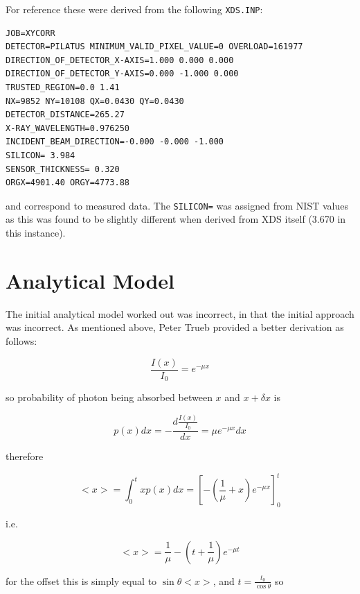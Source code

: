 \documentclass{article}
\begin{document}
\noindent
For reference these were derived from the following \verb|XDS.INP|:

{\small
\begin{verbatim}
JOB=XYCORR
DETECTOR=PILATUS MINIMUM_VALID_PIXEL_VALUE=0 OVERLOAD=161977
DIRECTION_OF_DETECTOR_X-AXIS=1.000 0.000 0.000
DIRECTION_OF_DETECTOR_Y-AXIS=0.000 -1.000 0.000
TRUSTED_REGION=0.0 1.41
NX=9852 NY=10108 QX=0.0430 QY=0.0430
DETECTOR_DISTANCE=265.27
X-RAY_WAVELENGTH=0.976250
INCIDENT_BEAM_DIRECTION=-0.000 -0.000 -1.000
SILICON= 3.984
SENSOR_THICKNESS= 0.320
ORGX=4901.40 ORGY=4773.88
\end{verbatim}
}

\noindent
and correspond to measured data. The \verb|SILICON=| was assigned
from NIST values as this was found to be slightly different when
derived from XDS itself (3.670 in this instance). 

\section{Analytical Model}

The initial analytical model worked out was incorrect, in that the
initial approach was incorrect. As mentioned above, Peter Trueb
provided a better derivation as follows:

\begin{equation}
\frac{I(x)}{I_0} = e^{- \mu x}
\end{equation}

\noindent
so probability of photon being absorbed between $x$ and $x + \delta x$
is

\begin{equation}
p(x) dx = - \frac{d \frac{I(x)}{I_0}}{dx} = \mu e^{- \mu x} dx
\end{equation}

\noindent
therefore 

\begin{equation}
<x> = \int_0^t x p(x) dx = \left[ - \left( \frac{1}{\mu} + x \right) 
e^{- \mu x} \right]_0^t
\end{equation}

\noindent
i.e.

\begin{equation}
<x> = \frac{1}{\mu} - \left( t + \frac{1}{\mu} \right) e^{- \mu t}
\end{equation}

\noindent
for the offset this is simply equal to $\sin \theta <x>$, and $t =
\frac{t_0}{\cos \theta}$ so
\end{document}
